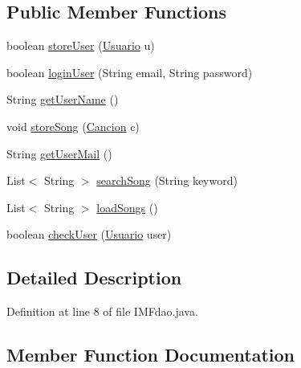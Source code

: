 \subsection*{Public Member Functions}
\begin{DoxyCompactItemize}
\item 
boolean \hyperlink{interfacees_1_1deusto_1_1spq_1_1server_1_1dao_1_1_i_m_fdao_a3106afd4fe9bbf720f98c8a8c4a9f433}{store\+User} (\hyperlink{classes_1_1deusto_1_1spq_1_1server_1_1data_1_1_usuario}{Usuario} u)
\item 
boolean \hyperlink{interfacees_1_1deusto_1_1spq_1_1server_1_1dao_1_1_i_m_fdao_abc85b827eab8794bd6e00f1df9cf156d}{login\+User} (String email, String password)
\item 
String \hyperlink{interfacees_1_1deusto_1_1spq_1_1server_1_1dao_1_1_i_m_fdao_a1a090e575d74774692844b5543320fc4}{get\+User\+Name} ()
\item 
void \hyperlink{interfacees_1_1deusto_1_1spq_1_1server_1_1dao_1_1_i_m_fdao_a8d0676aebfd63e2bd07ab7a6ff8e7571}{store\+Song} (\hyperlink{classes_1_1deusto_1_1spq_1_1server_1_1data_1_1_cancion}{Cancion} c)
\item 
String \hyperlink{interfacees_1_1deusto_1_1spq_1_1server_1_1dao_1_1_i_m_fdao_acd2152ac1a19753c426b0a0e32dc3e47}{get\+User\+Mail} ()
\item 
List$<$ String $>$ \hyperlink{interfacees_1_1deusto_1_1spq_1_1server_1_1dao_1_1_i_m_fdao_a365443ee24a364f5b4824318ed90af6d}{search\+Song} (String keyword)
\item 
List$<$ String $>$ \hyperlink{interfacees_1_1deusto_1_1spq_1_1server_1_1dao_1_1_i_m_fdao_a2dbfe3fad8b76ecf116fc3411b3280d5}{load\+Songs} ()
\item 
boolean \hyperlink{interfacees_1_1deusto_1_1spq_1_1server_1_1dao_1_1_i_m_fdao_a2babd39655f8a57f0b64d3bd912e3215}{check\+User} (\hyperlink{classes_1_1deusto_1_1spq_1_1server_1_1data_1_1_usuario}{Usuario} user)
\end{DoxyCompactItemize}


\subsection{Detailed Description}


Definition at line 8 of file I\+M\+Fdao.\+java.



\subsection{Member Function Documentation}
